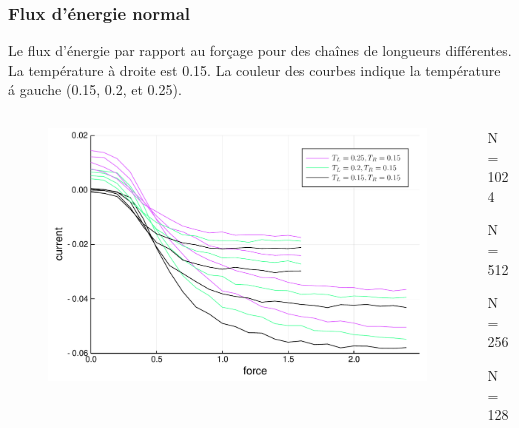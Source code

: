 \begin{frame}

    \frametitle{Flux d'énergie normal}

    Le flux d'énergie par rapport au forçage pour des chaînes de longueurs
    différentes. La température à droite est 0.15. La couleur des courbes
    indique la température á gauche (0.15, 0.2, et 0.25).

    \begin{columns}

        \begin{column}{0.8\textwidth}
            \begin{figure}
                \includegraphics[scale=0.4]{plots/energy_current_normal.pdf}
            \end{figure}
        \end{column}

        \begin{column}{0.2\textwidth}

            \scriptsize

            \vspace{18.0mm}
            N = 1024

            \vspace{3.0mm}
            N = 512

            \vspace{4.0mm}
            N = 256

            \vspace{5.0mm}
            N = 128

        \end{column}

    \end{columns}

\end{frame}

